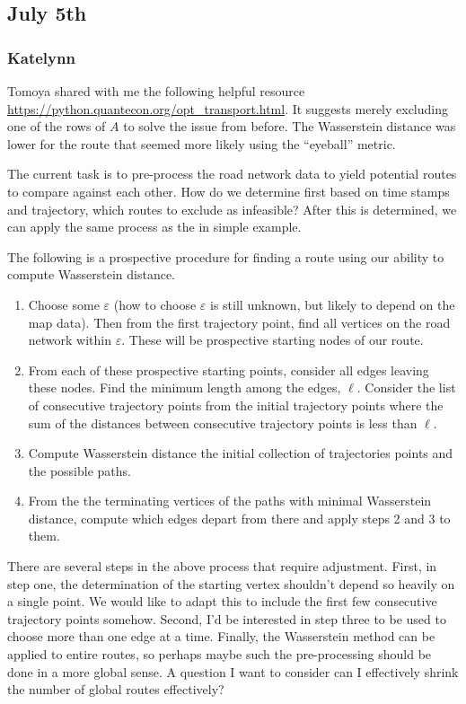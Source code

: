 \documentclass{article}
\numberwithin{equation}{section}
\theoremstyle{definition}
\begin{document}
\subsection{July 5th}

 \subsubsection*{Katelynn} 
 
Tomoya shared with me the following helpful resource \url{https://python.quantecon.org/opt_transport.html}. It suggests merely excluding one of the rows of $A$ to solve the issue from before. The Wasserstein distance was lower for the route that seemed more likely using the ``eyeball'' metric.

The current task is to pre-process the road network data to yield potential routes to compare against each other. How do we determine first based on time stamps and trajectory, which routes to exclude as infeasible? After this is determined, we can apply the same process as the in simple example.  

The following is a prospective procedure for finding a route using our ability to compute Wasserstein distance. 
\begin{enumerate}
    \item Choose some $\varepsilon$ (how to choose $\varepsilon$ is still unknown, but likely to depend on the map data). Then from the first trajectory point, find all vertices on the road network within $\varepsilon$. These will be prospective starting nodes of our route. 
    \item From each of these prospective starting points, consider all edges leaving these nodes. Find the minimum length among the edges, $\ell$. Consider the list of consecutive trajectory points from the initial trajectory points where the sum of the distances between consecutive trajectory points is less than $\ell$. 
    \item Compute Wasserstein distance the initial collection of trajectories points and the possible paths. 
    \item From the the terminating vertices of the paths with minimal Wasserstein distance, compute which edges depart from there and apply steps 2 and 3 to them.
\end{enumerate}
There are several steps in the above process that require adjustment. First, in step one, the determination of the starting vertex shouldn't depend so heavily on a single point. We would like to adapt this to include the first few consecutive trajectory points somehow. Second, I'd be interested in step three to be used to choose more than one edge at a time. Finally, the Wasserstein method can be applied to entire routes, so perhaps maybe such the pre-processing should be done in a more global sense. A question I want to consider can I effectively shrink the number of global routes effectively?
\end{document}
